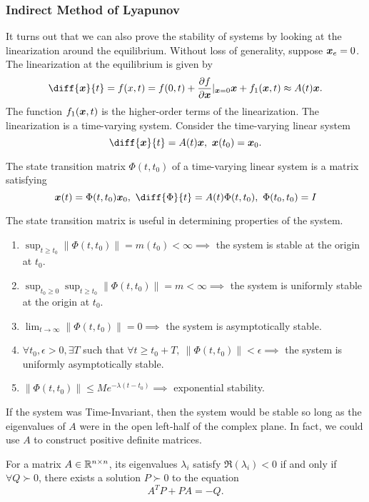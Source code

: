 \subsubsection{Indirect Method of Lyapunov}
It turns out that we can also prove the stability of systems by looking at the
linearization around the equilibrium. Without loss of generality, suppose
$\boldsymbol{x}_e = 0$. The linearization at the equilibrium is given by \[
	\diff{\bs{x}}{t} = f(x,t) = f(0, t) + \frac{\partial f}{\partial
	\bs{x}}|_{\bs{x} = 0}\bs{x} + f_1(\bs{x},t) \approx A(t)\bs{x}.
\]
The function $f_1(\boldsymbol{x}, t)$ is the higher-order terms of the linearization.
The linearization is a time-varying system.
Consider the time-varying linear system
\[
	\diff{\bs{x}}{t} = A(t)\bs{x},\ \bs{x}(t_0) = \bs{x}_0.
\]
\begin{definition}
	The state transition matrix $\Phi(t, t_0)$ of a time-varying linear system is
	a matrix satisfying \[
		\bs{x}(t) = \Phi(t, t_0)\bs{x}_0,\ \diff{\Phi}{t} = A(t)\Phi(t, t_0),\
		\Phi(t_0, t_0) = I
	\]
	\label{defn:state-transition-matrix}
\end{definition}
The state transition matrix is useful in determining properties of the system.
\begin{enumerate}
	\item $\sup_{t\geq t_0} \|\Phi(t, t_0)\| = m(t_0) < \infty \implies$ the system
		is stable at the origin at $t_0$.
	\item $\sup_{t_0\geq 0}\sup_{t\geq t_0} \|\Phi(t, t_0)\| = m < \infty \implies$ the system
		is uniformly stable at the origin at $t_0$.
	\item $\lim_{t\to\infty}\|\Phi(t, t_0)\| = 0 \implies$ the system is
		asymptotically stable.
	\item $\forall t_0,\epsilon>0,\exists T$ such that $\forall t\geq t_0 + T,\ \|\Phi(t, t_0)\| <
		\epsilon \implies$ the system is uniformly asymptotically stable.
	\item $\|\Phi(t, t_0)\| \leq Me^{-\lambda(t-t_0)} \implies$ exponential
		stability.
\end{enumerate}
If the system was Time-Invariant, then the system would be stable so long as the
eigenvalues of $A$ were in the open left-half of the complex plane. In fact, we
could use $A$ to construct positive definite matrices.
\begin{theorem}
	For a matrix $A\in \mathbb{R}^{n\times n}$, its eigenvalues $\lambda_i$ satisfy
	$\Re(\lambda_i) < 0$ if and only if $\forall Q \succ 0$, there exists
	a solution $P\succ 0$ to the equation \[
		A^TP + PA = -Q.
	\]
	\label{thm:lyapunov-lemma}
\end{theorem}
